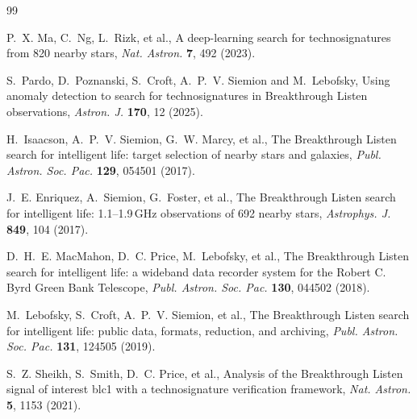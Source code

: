 \documentclass[3p,11pt]{elsarticle}
\begin{document}
\begin{thebibliography}{99}\small\raggedright
\setlength{\itemsep}{1pt}

P.~X. Ma, C.~Ng, L.~Rizk, et al., A deep-learning search for technosignatures from 820 nearby stars, \emph{Nat.
Astron.} \textbf{7}, 492 (2023).

S.~Pardo, D.~Poznanski, S.~Croft, A.~P.~V. Siemion and M.~Lebofsky, Using anomaly detection to search for
technosignatures in Breakthrough Listen observations, \emph{Astron. J.} \textbf{170}, 12 (2025).

H.~Isaacson, A.~P.~V. Siemion, G.~W. Marcy, et al., The Breakthrough Listen search for intelligent life: target
selection of nearby stars and galaxies, \emph{Publ. Astron. Soc. Pac.} \textbf{129}, 054501 (2017).

J.~E. Enriquez, A.~Siemion, G.~Foster, et al., The Breakthrough Listen search for intelligent life: 1.1--1.9\,GHz
observations of 692 nearby stars, \emph{Astrophys. J.} \textbf{849}, 104 (2017).

D.~H.~E. MacMahon, D.~C. Price, M.~Lebofsky, et al., The Breakthrough Listen search for intelligent life: a wideband
data recorder system for the Robert C. Byrd Green Bank Telescope, \emph{Publ. Astron. Soc. Pac.} \textbf{130}, 044502
(2018).

M.~Lebofsky, S.~Croft, A.~P.~V. Siemion, et al., The Breakthrough Listen search for intelligent life: public data,
formats, reduction, and archiving, \emph{Publ. Astron. Soc. Pac.} \textbf{131}, 124505 (2019).

S.~Z. Sheikh, S.~Smith, D.~C. Price, et al., Analysis of the Breakthrough Listen signal of interest blc1 with a
technosignature verification framework, \emph{Nat. Astron.} \textbf{5}, 1153 (2021).

\end{thebibliography}
\end{document}
